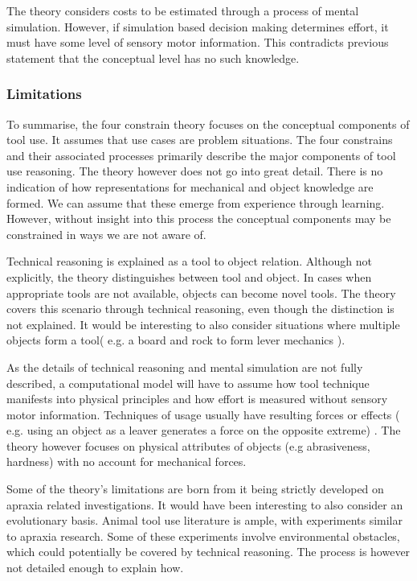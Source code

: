 \documentclass[11]{article}
\begin{document}
The theory considers costs to be estimated through a process of mental simulation. However, if simulation based decision making determines effort, it must have some level of sensory motor information. This contradicts previous statement that the conceptual level has no such knowledge.

\subsubsection*{Limitations}
To summarise, the four constrain theory focuses on the conceptual components of tool use. It assumes that use cases are problem situations\cite{osiurak2014}. The four constrains and their associated processes primarily describe the major components of tool use reasoning. The theory however does not go into great detail. There is no indication of how representations for mechanical and object knowledge are formed. We can assume that these emerge from experience through learning. However, without insight into this process the conceptual components may be constrained in ways we are not aware of.

Technical reasoning is explained as a tool to object relation. Although not explicitly, the theory distinguishes between tool and object. In cases when appropriate tools are not available, objects can become novel tools. The theory covers this scenario through technical reasoning, even though the distinction is not explained. It would be interesting to also consider situations where multiple objects form a tool( e.g. a board and rock to form lever mechanics ).

As the details of technical reasoning and mental simulation are not fully described, a computational model will have to assume how tool technique manifests into physical principles and how effort is measured without sensory motor information. Techniques of usage usually have resulting forces or effects ( e.g. using an object as a leaver generates a force on the opposite extreme) . The theory however focuses on physical attributes of objects (e.g abrasiveness, hardness) with no account for mechanical forces.

Some of the theory's limitations are born from it being strictly developed on apraxia related investigations. It would have been interesting to also consider an evolutionary basis. Animal tool use literature is ample, with experiments similar to apraxia research. Some of these experiments involve environmental obstacles, which could potentially be covered by technical reasoning. The process is however not detailed enough to explain how. 
\end{document}
